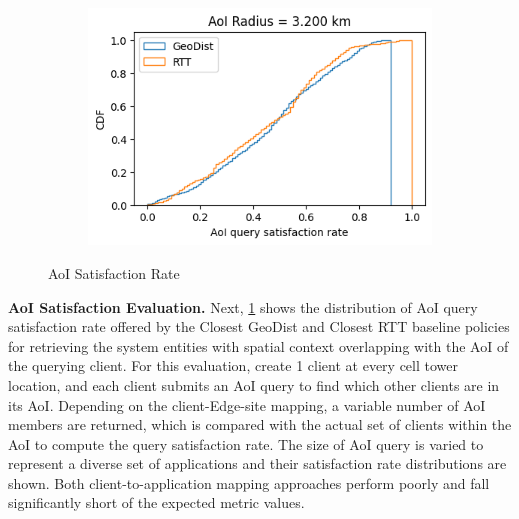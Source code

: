 \begin{figure}
\begin{subfigure}{0.333\textwidth}
  \caption{}
\end{subfigure}%
\begin{subfigure}{0.333\textwidth}
  \centering
  \includegraphics[width=\linewidth]{figures/mechanisms/spatial_ctx_mgmt/aoi_satisfaction_rate_cdf_AOI_3.200_km.png}
  \caption{}
\end{subfigure}
\caption{AoI Satisfaction Rate}
\label{fig:aoi_satisfaction_rate_eval}
\end{figure}

\par \noindent \textbf{AoI Satisfaction Evaluation.} Next, \cref{fig:aoi_satisfaction_rate_eval} shows the distribution of AoI query satisfaction rate offered by the Closest GeoDist and Closest RTT baseline policies for retrieving the system entities with spatial context overlapping with the AoI of the querying client. For this evaluation, create 1 client at every cell tower location, and each client submits an AoI query to find which other clients are in its AoI. Depending on the client-Edge-site mapping, a variable number of AoI members are returned, which is compared with the actual set of clients within the AoI to compute the query satisfaction rate. The size of AoI query is varied to represent a diverse set of applications and their satisfaction rate distributions are shown. Both client-to-application mapping approaches perform poorly and fall significantly short of the expected metric values.

